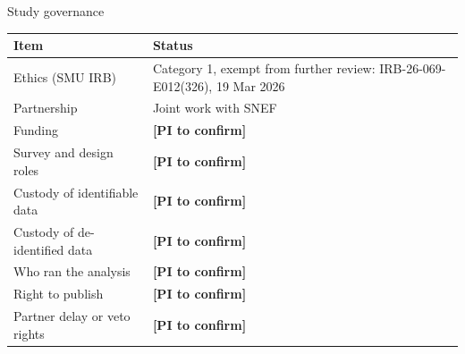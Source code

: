 \begin{frame}[t,label=B-governance]{Study governance}
  \FrameTop %
  {\fontsize{9.5}{11.6}\selectfont\renewcommand{\arraystretch}{1.08}%
  \begin{tabularx}{\linewidth}{@{}>{\RaggedRight}p{5.4cm}>{\RaggedRight\arraybackslash}X@{}}
    \toprule
    \textbf{Item} & \textbf{Status}\\
    \midrule
    Ethics (SMU IRB) & Category 1, exempt from further review: IRB-26-069-E012(326), 19 Mar 2026\\ %
    Partnership & Joint work with SNEF\\
    Funding & \textbf{[PI to confirm]}\\
    Survey and design roles & \textbf{[PI to confirm]}\\
    Custody of identifiable data & \textbf{[PI to confirm]}\\
    Custody of de-identified data & \textbf{[PI to confirm]}\\
    Who ran the analysis & \textbf{[PI to confirm]}\\
    Right to publish & \textbf{[PI to confirm]}\\
    Partner delay or veto rights & \textbf{[PI to confirm]}\\
    \bottomrule
  \end{tabularx}\par}
\end{frame}


